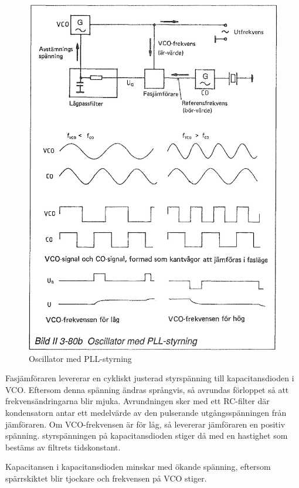 \begin{figure}
  \includegraphics[width=\textwidth]{images/bild_2_3-80b}
  \caption{Oscillator med PLL-styrning}
  \label{fig:BildII3-80b}
\end{figure}

Fasjämföraren levererar en cykliskt justerad styrspänning till
kapacitansdioden i VCO. Eftersom denna spänning ändras språngvis, så
avrundas förloppet så att frekvensändringarna blir mjuka. Avrundningen
sker med ett RC-filter där kondensatorn antar ett medelvärde av den
pulserande utgångsspänningen från jämföraren. Om VCO-frekvensen är för
låg, så levererar jämföraren en positiv spänning. styrspänningen på
kapacitansdioden stiger då med en hastighet som bestäms av filtrets
tidskonstant.

Kapacitansen i kapacitansdioden minskar med ökande spänning, eftersom
spärrskiktet blir tjockare och frekvensen på VCO stiger.


